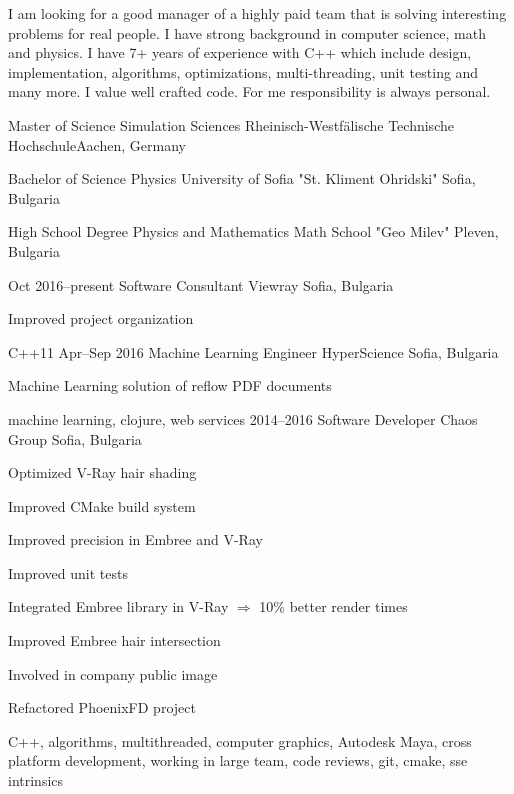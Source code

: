 I am looking for a good manager of a highly paid team that is solving
interesting problems for real people. I have strong background in computer
science, math and physics. I have 7+ years of experience with C++ which include
design, implementation, algorithms, optimizations, multi-threading, unit
testing and many more. I value well crafted code. For me responsibility is
always personal.



{Master of Science}
{Simulation Sciences}
{Rheinisch-Westfälische Technische Hochschule}{Aachen, Germany}

{Bachelor of Science}
{Physics}
{University of Sofia "St. Kliment Ohridski"}
{Sofia, Bulgaria}

{High School Degree}
{Physics and Mathematics}
{Math School "Geo Milev"}
{Pleven, Bulgaria}

\myjobbb
{Oct 2016--present}
{Software Consultant}
{Viewray}
{Sofia, Bulgaria}
{\item Improved project organization}
{C++11}
\myjobbb
{Apr--Sep 2016}
{Machine Learning Engineer}
{HyperScience}
{Sofia, Bulgaria}
{ \item Machine Learning solution of reflow PDF documents}
{machine learning, clojure, web services}
\myjobb
{2014--2016}
{Software Developer}
{Chaos Group}
{Sofia, Bulgaria}
{
\item Optimized V-Ray hair shading
\item Improved CMake build system 
\item Improved precision in Embree and V-Ray
\item Improved unit tests
}
{
\item Integrated Embree library in V-Ray $\Rightarrow$ 10\% better render times 
\item Improved Embree hair intersection 
\item Involved in company public image
\item Refactored PhoenixFD project
}
{C++, algorithms, multithreaded, computer graphics, Autodesk Maya, cross platform development, working in large team, code reviews, git, cmake, sse intrinsics}

